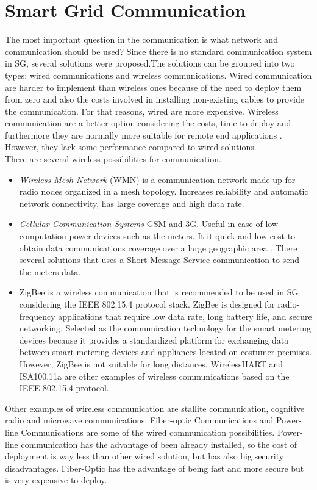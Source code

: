 \section{Smart Grid Communication}
The most important question in the communication is what network and communication should be used\cite{journals/comsur/FangMXY12}? Since there is no standard communication system in SG, several solutions were proposed.The solutions can be grouped into two types: wired communications and wireless communications. Wired communication are harder to implement than wireless ones because of the need to deploy them from zero and also the costs involved in installing non-existing cables to provide the communication. For that reasons, wired are more expensive.  Wireless communication are a better option considering the costs, time to deploy and furthermore they are normally more suitable for remote end applications \cite{parikh2010opportunities}. However, they lack some performance compared to wired solutions.\\
There are several wireless possibilities for communication.\\
\begin{itemize}
  \item \textit{Wireless Mesh Network} (WMN) is a communication network made up for radio nodes organized in a mesh topology\cite{journals/comsur/FangMXY12}. Increases reliability and automatic network connectivity, has large coverage and high data rate.
\item \textit{Cellular Communication Systems}  GSM and 3G. Useful in case of low computation power devices such as the meters. It it quick and low-cost to obtain data communications coverage over a large geographic area \cite{akyol2010survey}. There several solutions that uses a Short Message Service communication to send the meters data.
\item {} ZigBee is a wireless communication that is recommended to be used in SG considering the IEEE 802.15.4 protocol stack\cite{parikh2010opportunities}. ZigBee is designed for radio-frequency applications that require low data rate, long battery life, and secure networking. Selected as the communication technology for the smart metering devices\cite{farhangi2010path} because it provides a standardized platform for exchanging data between smart metering devices and appliances located on costumer  premises\cite{journals/comsur/FangMXY12}. However, ZigBee is not suitable for long distances. WirelessHART and ISA100.11a are other examples of wireless communications based on the IEEE 802.15.4 protocol.
\end{itemize}
Other examples of wireless communication are stallite communication, cognitive radio and  microwave communications.
Fiber-optic Communications and Power-line Communications are some of the wired communication possibilities. Power-line communication has the advantage of been already installed, so the cost of deployment is way less than other wired solution, but has also big security disadvantages. Fiber-Optic has the advantage of being fast and more secure but is very expensive to deploy.\\



